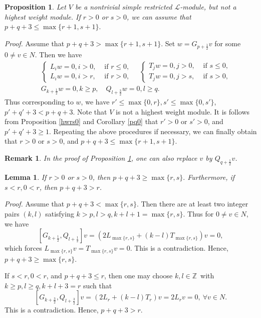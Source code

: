 \documentclass[12pt]{article}
\def\ssc{\scriptscriptstyle}
\def\Z{\mathbb{Z}{\ssc\,}}
\numberwithin{equation}{section}
\newtheorem{rema}[theo]{Remark}
\newtheorem{lemm}[theo]{Lemma}
\newtheorem{prop}[theo]{Proposition}
\begin{document}
\begin{prop}\label{pq<}  Let $V$ be a nontrivial simple  restricted $\mathcal{L}$-module, but not a highest weight module. If $r>0$ or $s>0$, we can assume that $p+q+3\le \max\{r+1,s+1\}.$
\end{prop}
{\it Proof.} Assume that  $p+q+3> \max\{r+1,s+1\}$. Set $w=G_{p+\frac{1}{2}}v$ for some $0\ne v\in N$. Then we have
\begin{eqnarray*}&&\left\{\begin{array}{ll} L_iw=0,i>0,& \mbox{ if }r\le 0,\\
 L_iw=0,i>r,& \mbox{ if }r> 0,
\end{array}\right.\quad \left\{\begin{array}{ll} T_jw=0,j>0,& \mbox{ if }s\le 0,\\
 T_jw=0,j>s,& \mbox{ if }s> 0,\end{array}\right.\\
&& G_{k+\frac{1}{2}}w=0,k\ge p,\quad  Q_{l+\frac{3}{2}}w=0, l\ge q.
\end{eqnarray*}
Thus corresponding to  $w$, we have  $r'\le \max\{0,r\},s'\le \max\{0,s'\}$, $p'+q'+3<p+q+3.$  Note that $V$ is not a highest weight module.
It is follows from Proposition \ref{hwrs0} and Corollary \ref{pq0} that $r'>0$ or $s'>0$, and  $p'+q'+3\ge 1$.
Repeating the above procedures if necessary, we can finally obtain that $r>0$ or $s>0$, and $p+q+3\le \max\{r+1,s+1\}.$

\begin{rema} In the proof of Proposition \ref{pq<}, one can also replace $v$ by $Q_{q+\frac{1}{2}}v$.
\end{rema}


\begin{lemm}\label{<pq} If $r>0$ or $s>0$, then $p+q+3\ge \max\{r,s\}.$ Furthermore, if $s<r, 0<r$, then $p+q+3>r$.
\end{lemm}

{\it Proof.} Assume that $p+q+3< \max\{r,s\}.$ Then there are at least two integer pairs $(k,l)$ satisfying  $k>p,l>q,k+l+1=\max\{r,s\}$. Thus for $0\ne v\in N$, we  have
$$[G_{k+\frac{1}{2}},Q_{l+\frac{1}{2}}]v=(2L_{\max\{r,s\}}+(k-l)T_{\max\{r,s\}})v=0,$$
which forces $L_{\max\{r,s\}}v=T_{\max\{r,s\}}v=0$. This is a  contradiction. Hence, $p+q+3\ge \max\{r,s\}.$

If $s<r, 0<r$, and $p+q+3\le r$, then one may choose $k,l\in\Z$ with $k\ge p, l\ge q, k+l+3=r$  such that
$$[G_{k+\frac{3}{2}},Q_{l+\frac{3}{2}}]v=(2L_{r}+(k-l)T_{r})v=2L_{r}v=0,\ \forall v\in N.$$
 This is a  contradiction. Hence,  $p+q+3>r$.
\end{document}
